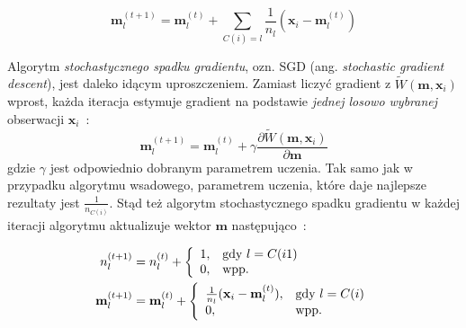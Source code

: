 \documentclass{praca1}
\begin{document}


\begin{equation}
\mathbf{m}_l^{(t+1)} = \mathbf{m}_l^{(t)} + \sum\limits_{C(i) = l}   \frac{1}{n_l}(\mathbf{x}_i - \mathbf{m}^{(t)}_l) %
\end{equation}

Algorytm \emph{stochastycznego spadku gradientu}, ozn. SGD (ang. \emph{stochastic gradient descent}), jest daleko idącym uproszczeniem. Zamiast liczyć gradient z $\widetilde{W}(\mathbf{m}, \mathbf{x}_i)$ wprost, każda iteracja estymuje gradient na podstawie \emph{jednej losowo wybranej} obserwacji $\mathbf{x}_i$~\cite{Bottou2012:sgdtricks}:
\begin{equation}
\mathbf{m}_l^{(t+1)} = \mathbf{m}_l^{(t)} + \gamma \frac{\partial \widetilde{W}(\mathbf{m}, \mathbf{x}_i)}{\partial \mathbf{m}}
\end{equation}
gdzie $\gamma$ jest odpowiednio dobranym parametrem uczenia. Tak samo jak w przypadku algorytmu wsadowego, parametrem uczenia, które daje najlepsze rezultaty jest $\frac{1}{n_{C(i)}}$. Stąd też algorytm stochastycznego spadku gradientu w każdej iteracji algorytmu aktualizuje wektor $\mathbf{m}$ następująco~\cite{Bottou1995:convergenceproperties}:

\begin{align}
n^{(t+1)}_l& = n^{(t)}_l + \left\{
\begin{array}{l l}     
    1, & \text{gdy } l = C(i1) \\
    0, & \text{wpp.}
\end{array}\right. \\
\mathbf{m}_l^{(t+1)}& = \mathbf{m}_l^{(t)} + \left\{
\begin{array}{l l}     
    \frac{1}{n_l}(\mathbf{x}_i - \mathbf{m}^{(t)}_l), & \text{gdy } l = C(i) \\
    0, & \text{wpp.}
\end{array}\right.
\end{align}
\end{document}
